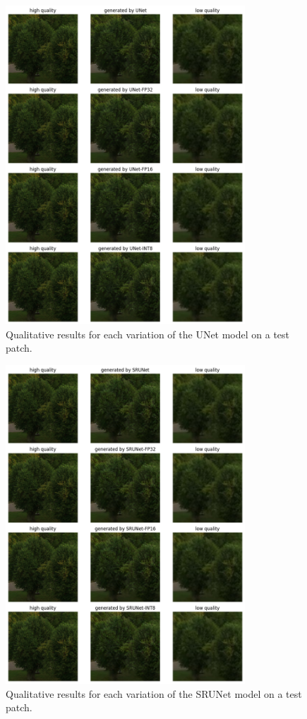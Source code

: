 \begin{figure}[ht]
\includegraphics[width=0.8\textwidth]{static/03_unet_qualitative_results.png}
\caption{Qualitative results for each variation of the UNet model on a test patch.}
\label{fig:trees-qualitative-unet}
\end{figure}

\begin{figure}[ht]
\includegraphics[width=0.8\textwidth]{static/03_srunet_qualitative_results.png}
\caption{Qualitative results for each variation of the SRUNet model on a test patch.}
\label{fig:trees-qualitative-srunet}
\end{figure}

